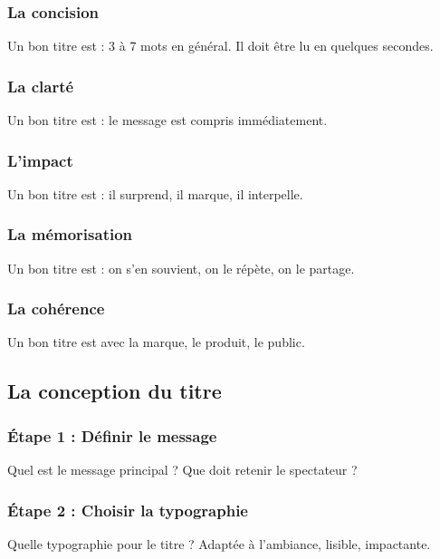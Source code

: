 \subsubsection{La concision}

Un bon titre est  : 3 à 7 mots en général. Il doit être lu en quelques secondes.

\subsubsection{La clarté}

Un bon titre est  : le message est compris immédiatement.

\subsubsection{L'impact}

Un bon titre est  : il surprend, il marque, il interpelle.

\subsubsection{La mémorisation}

Un bon titre est  : on s'en souvient, on le répète, on le partage.

\subsubsection{La cohérence}

Un bon titre est  avec la marque, le produit, le public.

\subsection{La conception du titre}

\subsubsection{Étape 1 : Définir le message}

Quel est le message principal ? Que doit retenir le spectateur ?

\subsubsection{Étape 2 : Choisir la typographie}

Quelle typographie pour le titre ? Adaptée à l'ambiance, lisible, impactante.

